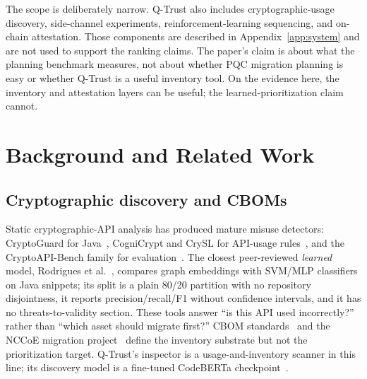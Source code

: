 \documentclass[conference,10pt]{IEEEtran}
\begin{document}
The scope is deliberately narrow. Q-Trust also includes cryptographic-usage discovery,
side-channel experiments, reinforcement-learning sequencing, and on-chain attestation. Those
components are described in Appendix~\ref{app:system} and are not used to support the ranking
claims. The paper's claim is about what the planning benchmark measures, not about whether PQC
migration planning is easy or whether Q-Trust is a useful inventory tool. On the evidence here,
the inventory and attestation layers can be useful; the learned-prioritization claim cannot.

\section{Background and Related Work}

\subsection{Cryptographic discovery and CBOMs}
Static cryptographic-API analysis has produced mature misuse detectors: CryptoGuard for
Java~\cite{cryptoguard}, CogniCrypt and CrySL for API-usage rules~\cite{cognicrypt,crysl}, and
the CryptoAPI-Bench family for evaluation~\cite{cryptoapibench,afrose2021}. The closest
peer-reviewed \emph{learned} model, Rodrigues et al.~\cite{rodrigues2023}, compares graph
embeddings with SVM/MLP classifiers on Java snippets; its split is a plain 80/20 partition with
no repository disjointness, it reports precision/recall/F1 without confidence intervals, and it
has no threats-to-validity section. These tools answer ``is this API used incorrectly?'' rather
than ``which asset should migrate first?'' CBOM standards~\cite{cyclonedx,ibm_cbom} and the
NCCoE migration project~\cite{nccoe_pqc} define the inventory substrate but not the
prioritization target. Q-Trust's inspector is a usage-and-inventory scanner in this line; its
discovery model is a fine-tuned CodeBERTa checkpoint~\cite{codebert,codeberta}.
\end{document}
